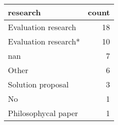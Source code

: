 \begin{tabular}{lr}
\toprule
             research &  count \\
\midrule
  Evaluation research &     18 \\
 Evaluation research* &     10 \\
                  nan &      7 \\
                Other &      6 \\
    Solution proposal &      3 \\
                   No &      1 \\
  Philosophycal paper &      1 \\
\bottomrule
\end{tabular}
